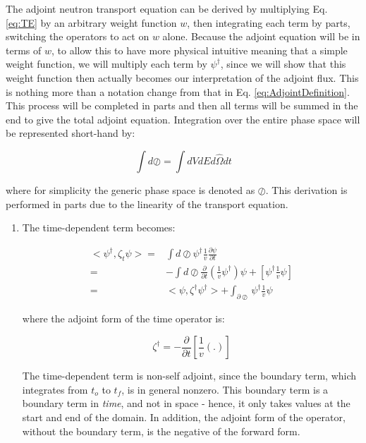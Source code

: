 \documentclass[10pt]{article}
\newcommand{\hO}{\hat{\Omega}}
\begin{document}
\begin{flushleft}
The adjoint neutron transport equation can be derived by multiplying Eq. \ref{eq:TE} by an arbitrary weight function \(w\), then integrating each term by parts, switching the operators to act on \(w\) alone. Because the adjoint equation will be in terms of \(w\), to allow this to have more physical intuitive meaning that a simple weight function, we will multiply each term by \(\psi^\dagger\), since we will show that this weight function then actually becomes our interpretation of the adjoint flux. This is nothing more than a notation change from that in Eq. \ref{eq:AdjointDefinition}. This process will be completed in parts and then all terms will be summed in the end to give the total adjoint equation. Integration over the entire phase space will be represented short-hand by:

\begin{equation}
\label{eq:PhaseSpaceIntegration}
\int d\oslash = \int dVdEd\hO  dt
\end{equation}

where for simplicity the generic phase space is denoted as \(\oslash\). This derivation is performed in parts due to the linearity of the transport equation.

\begin{enumerate}
\item The time-dependent term becomes:

\begin{equation}
\label{eq:AdjointTime}
\begin{aligned}
<\psi^\dagger, \zeta_t\psi> = & \int d\oslash \psi^\dagger \frac{1}{v} \frac{\partial\psi}{\partial t}\\
= & -\int d\oslash \frac{\partial}{\partial t} \left(\frac{1}{v}\psi^\dagger\right)\psi + [\psi^\dagger \frac{1}{v} \psi]\\
= & <\psi, \zeta^\dagger\psi^\dagger> + \int_{\partial\oslash}\psi^\dagger \frac{1}{v} \psi
\end{aligned}
\end{equation}

where the adjoint form of the time operator is:

\begin{equation}
\zeta^\dagger = -\frac{\partial}{\partial t}\left\lbrack\frac{1}{v}(.)\right\rbrack
\end{equation}

The time-dependent term is non-self adjoint, since the boundary term, which integrates from \(t_o\) to \(t_f\), is in general nonzero. This boundary term is a boundary term in \textit{time}, and not in space - hence, it only takes values at the start and end of the domain. In addition, the adjoint form of the operator, without the boundary term, is the negative of the forward form. 


\end{enumerate}
\end{flushleft}
\end{document}
